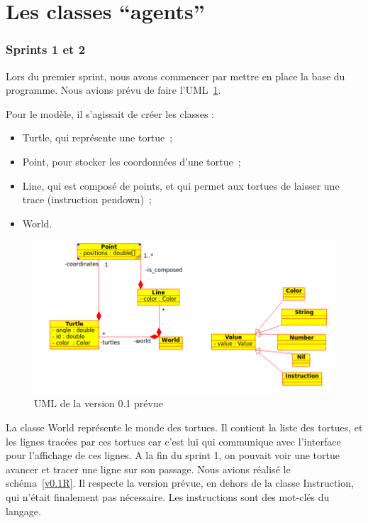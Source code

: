 \section{Les classes \enquote{agents}}
\subsubsection{Sprints 1 et 2}
Lors du premier sprint, nous avons commencer par mettre en place la base du programme. Nous avions prévu de faire l'UML~\ref{v0.1}.

 Pour le modèle, il s'agissait de créer les classes :
\begin{itemize}
\item Turtle, qui représente une tortue~;
\item Point, pour stocker les coordonnées d'une tortue~;
\item Line, qui est composé de points, et qui permet aux tortues de laisser une trace (instruction pendown)~;
\item World.
\end{itemize}


\begin{figure}[h]
\includegraphics[scale=0.5]{doc/report/uml/v01.png}
\caption{\label{v0.1} UML de la version 0.1 prévue}
\end{figure}


La classe World représente le monde des tortues. Il contient la liste des tortues, et les lignes tracées par ces tortues car c'est lui qui communique avec l'interface pour l'affichage de ces lignes.
A la fin du sprint 1, on pouvait voir une tortue avancer et tracer une ligne sur son passage.
Nous avions réalisé le schéma~\ref{v0.1R}. Il respecte la version prévue, en dehors de la classe Instruction, qui n'était finalement pas nécessaire. Les instructions sont des mot-clés du langage.\\

